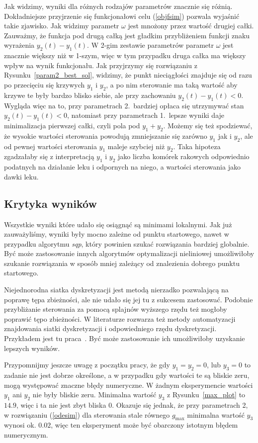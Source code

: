 \documentclass[11pt]{article}
\begin{document}
Jak widzimy, wyniki dla różnych rodzajów parametrów znacznie się różnią. Dokładniejsze przyjrzenie się funkcjonałowi celu (\ref{objfsim}) pozwala wyjaśnić takie zjawisko. Jak widzimy parametr $\omega$ jest mnożony przez wartość drugiej całki. Zauważmy, że funkcja pod drugą całką jest gładkim przybliżeniem funkcji znaku wyrażenia $y_2(t) - y_1(t)$. W 2-gim zestawie parametrów parametr $\omega$ jest znacznie większy niż w 1-szym, więc w tym przypadku druga całka ma większy wpływ na wynik funkcjonału. Jak przyjrzymy się rozwiązaniu z Rysunku~\ref{param2_best_sol}, widzimy, że punkt nieciągłości znajduje się od razu po przecięciu się krzywych $y_1$ i $y_2$, a po nim sterowanie ma taką wartość aby krzywe te były bardzo blisko siebie, ale przy zachowaniu $y_2(t) - y_1(t) < 0$. Wygląda więc na to, przy parametrach 2.\ bardziej opłaca się utrzymywać stan $y_2(t) - y_1(t) < 0$, natomiast przy parametrach 1.\ lepsze wyniki daje minimalizacja pierwszej całki, czyli pola pod $y_1 + y_2$. Możemy się też spodziewać, że wysokie wartości sterowania powodują zmniejszanie się zarówno $y_1$ jak i $y_2$, ale od pewnej wartości sterowania $y_1$ maleje szybciej niż $y_2$. Taka hipoteza zgadzałaby się z interpretacją $y_1$ i $y_2$ jako liczba komórek rakowych odpowiednio podatnych na działanie leku i odpornych na niego, a wartości sterowania jako dawki leku.

\subsection{Krytyka wyników}
Wszystkie wyniki które udało się osiągnąć są minimami lokalnymi. Jak już zauważyliśmy, wyniki były mocno zależne od punktu startowego, nawet w przypadku algorytmu {\it sqp}, który powinien szukać rozwiązania bardziej globalnie. Być może zastosowanie innych algorytmów optymalizacji nieliniowej umożliwiłoby szukanie rozwiązania w sposób mniej zależący od znalezienia dobrego punktu startowego.

Niejednorodna siatka dyskretyzacji jest metodą nierzadko pozwalającą na poprawę tępa zbieżności, ale nie udało się jej tu z sukcesem zastosować. Podobnie przybliżanie sterowania za pomocą splajnów wyższego rzędu też mogłoby poprawić tępo zbieżności. W literaturze rozwarza też metody automatyzacji znajdowania siatki dyskretyzacji i odpowiedniego rzędu dyskretyzacji. Przykładem jest tu praca~\cite{Rao-ph}. Być może zastosowanie ich umożliwiłoby uzyskanie lepszych wyników.

Przypomnijmy jeszcze uwagę z początku pracy, że gdy $y_1 = y_2 = 0$, lub $y_3 = 0$ to zadanie nie jest dobrze określone, a w przypadku gdy wartości te są bliskie zeru, mogą występować znaczne błędy numeryczne. W żadnym eksperymencie wartości $y_1$ ani $y_2$ nie były bliskie zeru. Minimalna wartość $y_3$ z Rysunku~\ref{max_plot} to $14.9$, więc i ta nie jest zbyt bliska 0. Okazuje się jednak, że przy parametrach 2, w rozwiązaniu (\ref{odesim}) dla sterowania stale równego $g_{\max}$ minimalna wartość $y_3$ wynosi ok. $0.02$, więc ten eksperyment może być obarczony istotnym błędem numerycznym.

\newpage{}
{}

\end{document}

